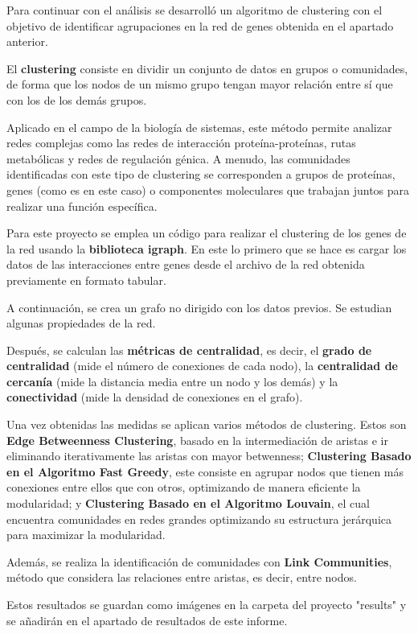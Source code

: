 Para continuar con el análisis se desarrolló un algoritmo de clustering con el objetivo de identificar agrupaciones en la red de genes obtenida en el apartado anterior.


El \textbf{clustering} consiste en dividir un conjunto de datos en grupos o comunidades, de forma que los nodos de un mismo grupo tengan mayor relación entre sí que con los de los demás grupos.

Aplicado en el campo de la biología de sistemas, este método permite analizar redes complejas como las redes de interacción proteína-proteínas, rutas metabólicas y redes de regulación génica. A menudo, las comunidades identificadas con este tipo de clustering se corresponden a grupos de proteínas, genes (como es en este caso) o componentes moleculares que trabajan juntos para realizar una función específica.

Para este proyecto se emplea un código para realizar el clustering de los genes de la red usando la \textbf{biblioteca igraph}. En este lo primero que se hace es cargar los datos de las interacciones entre genes desde el archivo de la red obtenida previamente en formato tabular.

A continuación, se crea un grafo no dirigido con los datos previos. Se estudian algunas propiedades de la red.

Después, se calculan las \textbf{métricas de centralidad}, es decir, el \textbf{grado de centralidad} (mide el número de conexiones de cada nodo), la \textbf{centralidad de cercanía} (mide la distancia media entre un nodo y los demás) y la \textbf{conectividad} (mide la densidad de conexiones en el grafo).

Una vez obtenidas las medidas se aplican varios métodos de clustering. Estos son \textbf{Edge Betweenness Clustering}, basado en la intermediación de aristas e ir eliminando iterativamente las aristas con mayor betwenness; \textbf{Clustering Basado en el Algoritmo Fast Greedy}, este consiste en agrupar nodos que tienen más conexiones entre ellos que con otros, optimizando de manera eficiente la modularidad; y \textbf{Clustering Basado en el Algoritmo Louvain}, el cual encuentra comunidades en redes grandes optimizando su estructura jerárquica para maximizar la modularidad.

Además, se realiza la identificación de comunidades con \textbf{Link Communities}, método que considera las relaciones entre aristas, es decir, entre nodos.

Estos resultados se guardan como imágenes en la carpeta del proyecto "results" y se añadirán en el apartado de resultados de este informe.

